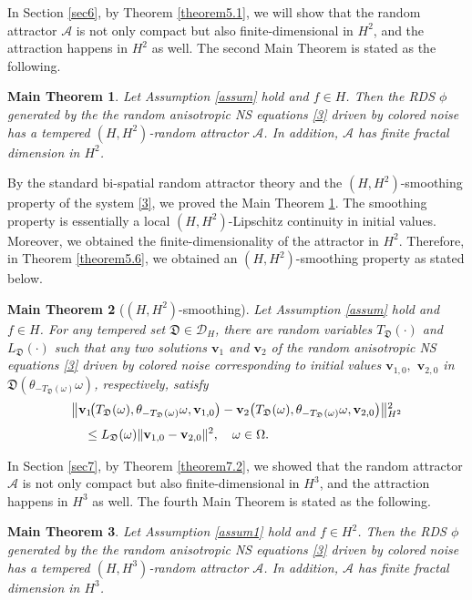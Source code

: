 \documentclass{elsarticle}
\newtheorem{main}{Main Theorem}
\theoremstyle{definition}
\numberwithin{equation}{section}
\newcommand{\D}{\mathcal{D}}
\newcommand{\A}{\mathcal{A}}
\begin{document}
In Section \ref{sec6}, by Theorem \ref{theorem5.1},  we will show that   the random attractor $\A$
  is not only compact but also finite-dimensional in $H^2$, and the attraction  happens in $H^2$ as well. The second  Main Theorem is stated as the following.
\begin{main}\label{main1}
Let Assumption \ref{assum} hold and $f\in H$. Then the  RDS $\phi$ generated by the the random anisotropic  NS equations \eqref{3} driven by colored noise  has  a tempered $(H,H^2)$-random attractor $\mathcal A $. In addition, $\mathcal A$ has finite fractal dimension in $H^2$.
\end{main}
By the standard bi-spatial random attractor theory \cite{cui18jdde} and the $(H,H^2)$-smoothing  property of the system \eqref{3}, we proved the Main Theorem \ref{main1}. The smoothing property is essentially a local $(H,H^2)$-Lipschitz continuity in initial values. Moreover, we obtained the finite-dimensionality of the attractor in $H^2$.  Therefore,  in Theorem \ref{theorem5.6}, we obtained an $(H,H^2)$-smoothing property as stated below.
\begin{main}[$(H, H^2)$-smoothing]
 Let Assumption \ref{assum} hold and $f\in H$. For   any tempered set $\mathfrak D \in \D_H$, there
  are  random variables $T_{{\mathfrak D}} (\cdot)  $   and $ L_{\mathfrak D}(\cdot )$ such that  any two solutions $\textbf{v}_1$ and $\textbf{v}_2$ of the random anisotropic  NS equations \eqref{3} driven by colored noise corresponding to initial values   $\textbf{v}_{1,0},$ $ \textbf{v}_{2,0}$ in $\mathfrak D \left (\theta_{-T_{\mathfrak D}(\omega)}\omega \right)$, respectively, satisfy
  \begin{align}
  &
  \big\|\textbf{v}_1 \!  \big (T_{\mathfrak D}(\omega),\theta_{-T_{\mathfrak D}(\omega)}\omega,\textbf{v}_{1,0}\big)
  -\textbf{v}_2 \big (T_{\mathfrak D}(\omega),\theta_{-T_{\mathfrak D}(\omega)}\omega,\textbf{v}_{2,0} \big) \big \|{^2_{H^2}}  \notag \\[0.8ex]
&\quad \leq  L_{\mathfrak D} (\omega)\|\textbf{v}_{1,0}-\textbf{v}_{2,0}\|^2,\quad \omega\in \Omega.\label{sep5.1}
\end{align}

\end{main}

In Section \ref{sec7}, by Theorem \ref{theorem7.2},  we showed that   the random attractor $\A$
  is not only compact but also finite-dimensional in $H^3$, and the attraction  happens in $H^3$ as well. The fourth  Main Theorem is stated as the following.
\begin{main}\label{main2}
Let Assumption \ref{assum1} hold and $f\in H^2$. Then the  RDS $\phi$ generated by the the random anisotropic  NS equations \eqref{3} driven by colored noise  has  a tempered $(H,H^3)$-random attractor $\mathcal A $. In addition, $\mathcal A$ has finite fractal dimension in $H^3$.
\end{main}
\end{document}

